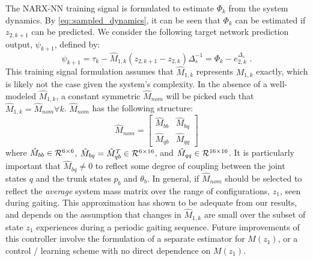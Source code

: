 			The  NARX-NN training signal is formulated to estimate $\Phi_{k}$ from the system dynamics. By \ref{eq::sampled_dynamics}, it can be seen that $\Phi_{k}$ can be estimated if ${z}_{2,k+1}$ can be predicted. We consider the following target network prediction output, $\psi_{k+1}$,  defined by:
				\begin{equation}
					\psi_{k+1} = \tau_{k} - \hat{M}_{1,k}({z}_{2,k+1} - {z}_{2,k})\Delta_{s}^{-1} = \Phi_{k} - {e}_{2,k}^{\Delta_{s}} \text{ .}
					\label{eq::training_signal}
				\end{equation}
			This training signal formulation assumes that $\hat{M}_{1,k}$ represents $M_{1,k}$ exactly, which is likely not the case given the system's complexity. In the absence of a well-modeled $\hat{M}_{1,k}$, a constant symmetric $\hat{M}_{nom}$ will be picked such that $\hat{M}_{1,k} = \hat{M}_{nom} \forall k$. $\hat{M}_{nom}$ has the following structure:
				\begin{equation}
					\hat{M}_{nom} = \left[
						\begin{array}{cc}
						\hat{M}_{bb}	&	 \hat{M}_{bq}\\
						\hat{M}_{qb}	&	 \hat{M}_{qq}
						\end{array}
					\right]
				\end{equation}
			where 	$\hat{M}_{bb}\in {\cal R}^{6\times6}$, 
					$\hat{M}_{bq}=\hat{M}_{qb}^{T} \in {\cal R}^{6\times16}$, and  
					$\hat{M}_{qq}\in {\cal R}^{16\times16}$. 
			It is particularly important that $\hat{M}_{bq}\neq0$ to reflect some degree of coupling between the joint states $q$ and the trunk states ${p}_{b}$ and $\theta_{b}$. In general, if $\hat{M}_{nom}$ should be selected to reflect the \emph{average} system mass matrix over the range of configurations, $z_{1}$, seen during gaiting. This approximation has shown to be adequate from our results, and depends on the assumption that changes in $\hat{M}_{1,k}$ are small  over the subset of state $z_{1}$ experiences during a periodic gaiting sequence. Future improvements of this controller involve the formulation of a separate estimator for $M(z_{1})$, or a control / learning scheme with no direct dependence on $M(z_{1})$.

